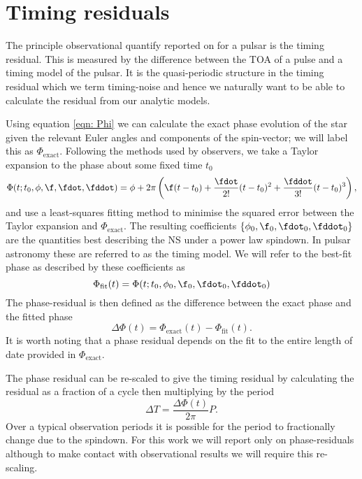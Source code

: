 \documentclass[/home/greg/Thesis/main/main.tex]{subfiles}
\begin{document}
\graphicspath{{/home/greg/Neutron_star_modelling/TimingResiduals/img/}}

\newcommand{\Phiexact}{\Phi_{\mathrm{exact}}}
\newcommand{\Phifit}{\Phi_{\mathrm{fit}}}
\newcommand{\wobbleangle}{\tilde{\theta}}
\FloatBarrier

\section{Timing residuals}
The principle observational quantify reported on for a pulsar is the timing 
residual. This is measured by the difference between the TOA of a pulse and
a timing model of the pulsar. It is the quasi-periodic structure in
the timing residual which we term timing-noise and hence we naturally want 
to be able to calculate the residual from our analytic models.

Using equation \eqref{eqn: Phi} we can calculate the exact phase evolution of
the star given the relevant Euler angles and components of the spin-vector; we
will label this as $\Phiexact$. Following the methods used by observers, we
take a Taylor expansion to the phase about some fixed time $t_{0}$
\begin{equation}
    \Phi(t; t_{0}, \phi, \f, \fdot, \fddot) = 
    \phi + 2\pi \left(\f(t - t_{0}) + 
                          \frac{\fdot}{2!}(t-t_{0})^{2} +
                          \frac{\fddot}{3!}(t-t_{0})^{3} 
                          \right),
\label{eqn: TR taylor expansion} 
\end{equation}
and use a least-squares fitting method to minimise the squared error between
the Taylor expansion and $\Phiexact$. The resulting coefficients $\{\phi_{0},
\f_{0}, \fdot_{0}, \fddot_{0}\}$ are the quantities best describing the NS
under a power law spindown. In pulsar astronomy these are referred to as the
timing model. We will refer to the best-fit phase as described by  these
coefficients as
\begin{equation}
    \Phifit(t) = \Phi(t; t_{0}, \phi_{0}, \f_{0}, \fdot_{0}, \fddot_{0})
\end{equation}
The phase-residual is then defined as the difference between the exact phase 
and the fitted phase
\begin{equation}
  \Delta\Phi(t) = \Phiexact(t) - \Phifit(t).
\end{equation}
It is worth noting that a phase residual depends on the fit to the entire
length of date provided in $\Phiexact$. 

The phase residual can be re-scaled to
give the timing residual by calculating the residual as a fraction of a cycle
then multiplying by the period
\begin{equation}
    \Delta T = \frac{\Delta\Phi(t)}{2\pi} P.
    \label{eqn: phase to timing}
\end{equation}
Over a typical observation periods it is possible for the period to
fractionally change due to the spindown. For this work we will report only on
phase-residuals although to make contact with observational results we will
require this re-scaling.
\end{document}
